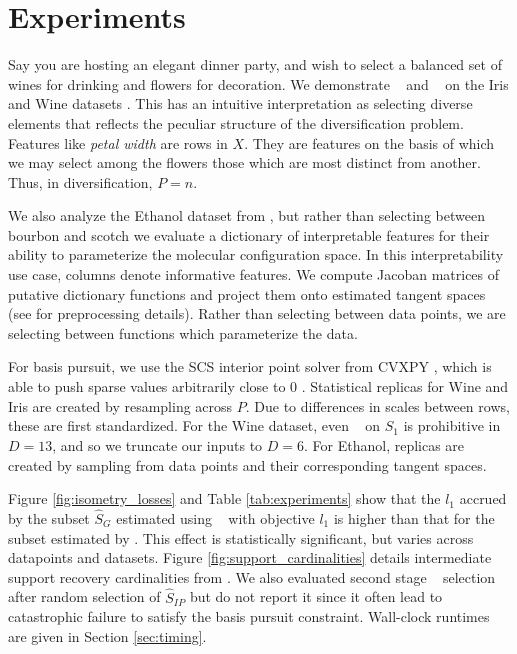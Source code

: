 \section{Experiments}
\label{sec:experiments}

Say you are hosting an elegant dinner party, and wish to select a balanced set of wines for drinking and flowers for decoration.
We demonstrate \tsip~ and \greedy~ on the Iris and Wine datasets \citep{misc_iris_53, misc_wine_109, scikit-learn}.
This has an intuitive interpretation as selecting diverse elements that reflects the peculiar structure of the diversification problem.
Features like \textit{ petal width} are rows in $X$.
They are features on the basis of which we may select among the flowers those which are most distinct from another.
Thus, in diversification, $P = n$.

We also analyze the Ethanol dataset from \citet{Chmiela2018-at, Koelle2022-ju}, but rather than selecting between bourbon and scotch we evaluate a dictionary of interpretable features for their ability to parameterize the molecular configuration space.
In this interpretability use case, columns denote informative features.
We compute Jacoban matrices of putative dictionary functions and project them onto estimated tangent spaces (see \citet{Koelle2022-ju} for preprocessing details).
Rather than selecting between data points, we are selecting between functions which parameterize the data.

For basis pursuit, we use the SCS interior point solver \citep{ocpb:16} from CVXPY \citep{diamond2016cvxpy, agrawal2018rewriting}, which is able to push sparse values arbitrarily close to 0 \citep{cvxpy_sparse_solution}.
Statistical replicas for Wine and Iris are created by resampling across $P$.
Due to differences in scales between rows, these are first standardized.
For the Wine dataset, even \brute~ on $\widehat {S}_1$ is prohibitive in $D=13$, and so we truncate our inputs to $D=6$.
For Ethanol, replicas are created by sampling from data points and their corresponding tangent spaces.

Figure \ref{fig:isometry_losses} and Table \ref{tab:experiments} show that the $l_1$ accrued by the subset $\widehat S_{G}$ estimated using \greedy~ with objective $l_1$ is higher than that for the subset estimated by \tsip.
This effect is statistically significant, but varies across datapoints and datasets.
Figure \ref{fig:support_cardinalities} details intermediate support recovery cardinalities from \isometrypursuit.
We also evaluated second stage \brute~ selection after random selection of $\widehat S_{IP}$ but do not report it since it often lead to catastrophic failure to satisfy the basis pursuit constraint.
Wall-clock runtimes are given in Section \ref{sec:timing}.

